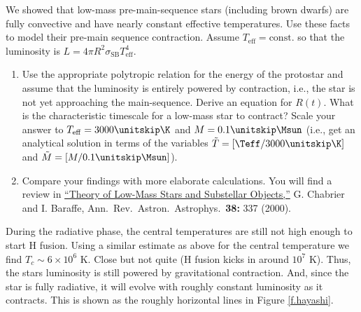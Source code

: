 \begin{exercisebox}
We showed that low-mass pre-main-sequence stars (including brown dwarfs) are fully convective and have nearly constant effective temperatures.  Use these facts to model their pre-main sequence contraction.  Assume $T_{\mathrm{eff}} = \mathrm{const.}$ so that the luminosity is $L = 4\pi R^{2} \sigma_{\mathrm{SB}} T_{\mathrm{eff}}^{4}$.

\begin{enumerate}
\item Use the appropriate polytropic relation for the energy of the protostar and assume that the luminosity is entirely powered by contraction, i.e., the star is not yet approaching the main-sequence. Derive an equation for $R(t)$. What is the characteristic timescale for a low-mass star to contract? Scale your answer to $T_{\mathrm{eff}} = 3000\nsp\K$ and $M = 0.1\nsp\Msun$ (i.e., get an analytical solution in terms of the variables $\tilde{T} = [\Teff/3000\nsp\K]$ and $\tilde{M} = [M/0.1\nsp\Msun]$).

\item Compare your findings with more elaborate calculations.  You will find a review in \href{http://arxiv.org/abs/astro-ph/0006383}{``Theory of Low-Mass Stars and Substellar Objects,''} G. Chabrier and I. Baraffe, Ann.\ Rev.\ Astron.\ Astrophys.\ \textbf{38:} 337 (2000).
\end{enumerate}
\end{exercisebox}

During the radiative phase, the central temperatures are still not high enough to start H fusion.
Using a similar estimate as above for the central temperature we find $T_c \sim 6\times10^6$ K.
Close but not quite (H fusion kicks in around $10^7$ K).
Thus, the stars luminosity is still powered by gravitational contraction.
And, since the star is fully radiative, it will evolve with roughly constant luminosity as it contracts.
This is shown as the roughly horizontal lines in Figure \ref{f.hayashi}.

